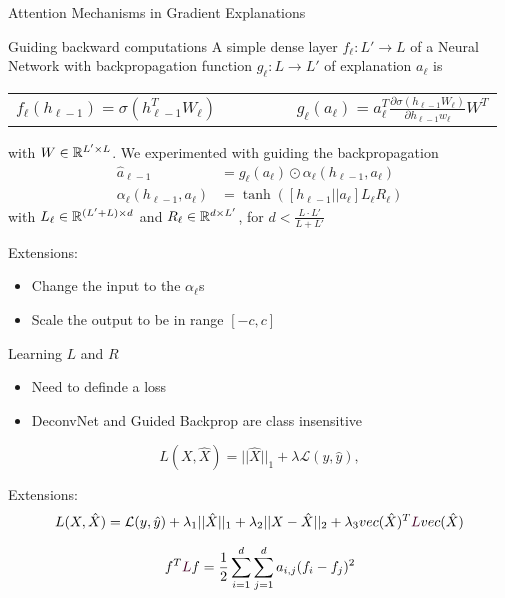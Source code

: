 \begin{frame}[standout]
	Attention Mechanisms in Gradient Explanations
\end{frame}

\begin{frame}{Guiding backward computations}
	A simple dense layer $f_\ell: L' \rightarrow L$ of a Neural Network 
	with backpropagation function $g_\ell: L \rightarrow L'$ of explanation $a_\ell$ is
	\begin{center}
	\begin{tabular}{cc}
		$
			f_\ell(h_{\ell-1}) = \sigma (h_{\ell-1}^T W_\ell)\qquad \qquad
		$ & 
		$
			g_\ell(a_\ell) = a_\ell^T \frac{\partial \sigma(h_{\ell-1}W_\ell)}{\partial h_{\ell-1}w_\ell} W^T
		$ 
	\end{tabular}
	\end{center}
	with $W \in \mathbb{R}^{L' \times  L}$.
	We experimented with guiding the backpropagation
	\begin{align*}
		\hat a_{\ell-1} &= g_\ell(a_\ell) \odot \alpha_\ell(h_{\ell-1}, a_{\ell}) \\ 
    	\alpha_\ell(h_{\ell-1}, a_\ell) &= \tanh \left( [h_{\ell-1} || a_\ell] L_\ell R_\ell \right)
	\end{align*}
	with $L_\ell\in \mathbb{R}^{(L'+L) \times d}$ and $R_\ell \in \mathbb{R}^{d \times L'}$, for $d < \frac{L\cdot L'}{L+L'}$

	\alert{Extensions:}
	\begin{itemize}
		\item Change the input to the $\alpha_\ell$s
		\item Scale the output to be in range $[-c, c]$
	\end{itemize}
\end{frame} 

\begin{frame}{Learning $L$ and $R$}
	\begin{itemize}
		\item Need to definde a loss
		\item DeconvNet and Guided Backprop are class insensitive
	\end{itemize}

	\begin{equation*}
 	 	 L(X, \hat X) = ||\hat X||_1 + \lambda \mathcal{L}(y, \hat y),
	\end{equation*}

	\alert{Extensions:}
	\begin{equation*}
		L(X, \hat X) = \mathcal{L}(y, \hat y) + \lambda_1 ||\hat X||_1 + \lambda_2 ||X - \hat X||_2 + \lambda_3 vec(\hat X)^T \rL vec(\hat X)
	\end{equation*}

	\begin{equation*}
		f^T \rL f = \frac{1}{2}\sum_{i=1}^d \sum_{j=1}^d a_{i,j} (f_i - f_j)^2
	\end{equation*}

\end{frame}

